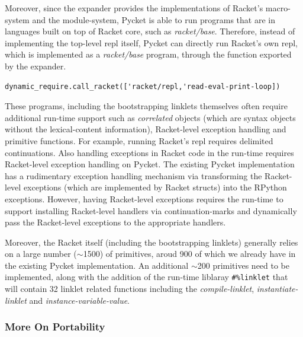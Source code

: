 Moreover, since the expander provides the implementations of Racket's
macro-system and the module-system, Pycket is able to run programs
that are in languages built on top of Racket core, such as
\emph{racket/base}. Therefore, instead of implementing the top-level
repl itself, Pycket can directly run Racket's own repl, which is
implemented as a \emph{racket/base} program, through the
 function exported by the expander.

{\footnotesize
\begin{lstlisting}[mathescape]
  dynamic_require.call_racket(['racket/repl,'read-eval-print-loop])
\end{lstlisting}
}

These programs, including the bootstrapping linklets themselves often
require additional run-time support such as \emph{correlated} objects
(which are syntax objects without the lexical-content information),
Racket-level exception handling and primitive functions. For example,
running Racket's repl requires delimited continuations. Also handling
exceptions in Racket code in the run-time requires Racket-level
exception handling on Pycket. The existing Pycket implementation has a
rudimentary exception handling mechanism via transforming the
Racket-level exceptions (which are implemented by Racket structs) into
the RPython exceptions. However, having Racket-level exceptions
requires the run-time to support installing Racket-level handlers via
continuation-marks and dynamically pass the Racket-level exceptions to
the appropriate handlers.

Moreover, the Racket itself (including the bootstrapping linklets)
generally relies on a large number ($\sim$1500) of primitives, aroud 900
of which we already have in the existing Pycket implementation. An
additional $\sim$200 primitives need to be implemented, along with the
addition of the run-time liblaray \texttt{\#\%linklet} that will
contain 32 linklet related functions including the
\emph{compile-linklet}, \emph{instantiate-linklet} and
\emph{instance-variable-value}.

\subsubsection{More On Portability}
\label{subsec:more-portability}

